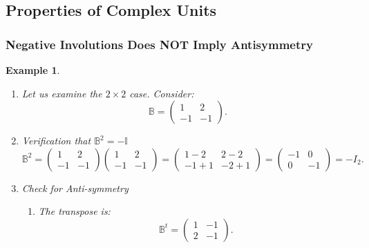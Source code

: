 \documentclass[aps,preprint]{revtex4}
\newtheorem{example}[theorem]{Example}
\begin{document}
\subsection{\textbf{Properties of Complex Units}}

\subsubsection{Negative Involutions Does \textbf{NOT} Imply Antisymmetry 
\label{Negative Involutions Does NOT Imply Antisymmetry}}

\begin{example}
\begin{enumerate}
\item Let us examine the $2\times 2$ case. Consider: 
\begin{equation*}
\mathbb{B}=%
\begin{pmatrix}
1 & 2 \\ 
-1 & -1%
\end{pmatrix}%
.
\end{equation*}

\item Verification that $\mathbb{B}^{2}=-\mathbb{I}$ 
\begin{equation*}
\mathbb{B}^{2}=%
\begin{pmatrix}
1 & 2 \\ 
-1 & -1%
\end{pmatrix}%
\begin{pmatrix}
1 & 2 \\ 
-1 & -1%
\end{pmatrix}%
=%
\begin{pmatrix}
1-2 & 2-2 \\ 
-1+1 & -2+1%
\end{pmatrix}%
=%
\begin{pmatrix}
-1 & 0 \\ 
0 & -1%
\end{pmatrix}%
=-I_{2}.
\end{equation*}

\item Check for Anti-symmetry

\begin{enumerate}
\item The transpose is: 
\begin{equation*}
\mathbb{B}^{t}=%
\begin{pmatrix}
1 & -1 \\ 
2 & -1%
\end{pmatrix}%
.
\end{equation*}


\end{enumerate}
\end{enumerate}
\end{example}
\end{document}
